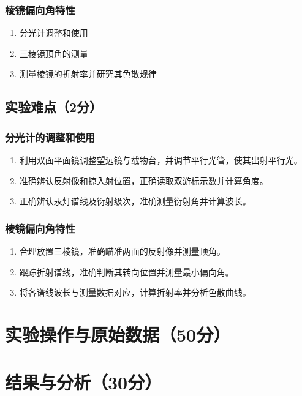 \documentclass[10pt,a4paper]{ctexart} %
\begin{document}
    \subsubsection{棱镜偏向角特性}
    \begin{enumerate}
      \item 分光计调整和使用
      \item 三棱镜顶角的测量
      \item 测量棱镜的折射率并研究其色散规律
    \end{enumerate}

  \subsection{实验难点（2分）}

    \subsubsection{分光计的调整和使用}
    \begin{enumerate}
      \item 利用双面平面镜调整望远镜与载物台，并调节平行光管，使其出射平行光。
      \item 准确辨认反射像和掠入射位置，正确读取双游标示数并计算角度。
      \item 正确辨认汞灯谱线及衍射级次，准确测量衍射角并计算波长。
    \end{enumerate}

    \subsubsection{棱镜偏向角特性}
    \begin{enumerate}
      \item 合理放置三棱镜，准确瞄准两面的反射像并测量顶角。
      \item 跟踪折射谱线，准确判断其转向位置并测量最小偏向角。
      \item 将各谱线波长与测量数据对应，计算折射率并分析色散曲线。
    \end{enumerate}

\section{实验操作与原始数据（50分）}

\section{结果与分析（30分）}
\end{document}
